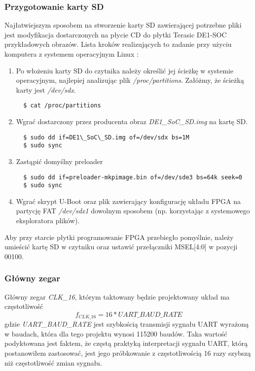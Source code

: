 \subsubsection{Przygotowanie karty SD}
Najłatwiejszym sposobem na stworzenie karty SD zawierającej potrzebne pliki jest modyfikacja dostarczonych na płycie CD do płytki Terasic DE1-SOC przykładowych obrazów. Lista kroków realizujących to zadanie przy użyciu komputera z systemem operacyjnym Linux \cite{rocketboards-booting-prebuild, rocketboards-updating-sd}:
\begin{enumerate}
\item Po włożeniu karty SD do czytnika należy określić jej ścieżkę w systemie operacyjnym, najlepiej analizując plik \textit{/proc/partitions}. Załóżmy, że ścieżką karty jest \textit{/dev/sdx}.
\begin{lstlisting}
  $ cat /proc/partitions
\end{lstlisting}

\item Wgrać dostarczony przez producenta obraz \textit{DE1\_SoC\_SD.img} na kartę SD.
\begin{lstlisting}
  $ sudo dd if=DE1\_SoC\_SD.img of=/dev/sdx bs=1M
  $ sudo sync
\end{lstlisting}

\item Zastąpić domyślny preloader
\begin{lstlisting}
  $ sudo dd if=preloader-mkpimage.bin of=/dev/sde3 bs=64k seek=0
  $ sudo sync
\end{lstlisting}

\item Wgrać skrypt U-Boot oraz plik zawierający konfigurację układu FPGA na partycję FAT \textit{/dev/sdx1} dowolnym sposobem (np. korzystając z systemowego eksploratora plików).
\end{enumerate}

Aby przy starcie płytki programowanie FPGA przebiegło pomyślnie, należy umieścić kartę SD w czytniku oraz ustawić przełączniki MSEL[4:0] w pozycji 00100.

\subsubsection{Główny zegar}
Główny zegar \textit{CLK\_16}, którym taktowany będzie projektowany układ ma częstotliwość
\begin{equation}
f_{CLK\_16} = 16 * UART\_BAUD\_RATE
\end{equation}
gdzie \textit{UART\_BAUD\_RATE} jest szybkością transmisji sygnału UART wyrażoną w baudach, która dla tego projektu wynosi 115200 baudów. Taka wartość podyktowana jest faktem, że częstą praktyką interpretacji sygnału UART, którą postanowiłem zastosować, jest jego próbkowanie z częstotliwością 16 razy szybszą niż częstotliwość zmian sygnału.

